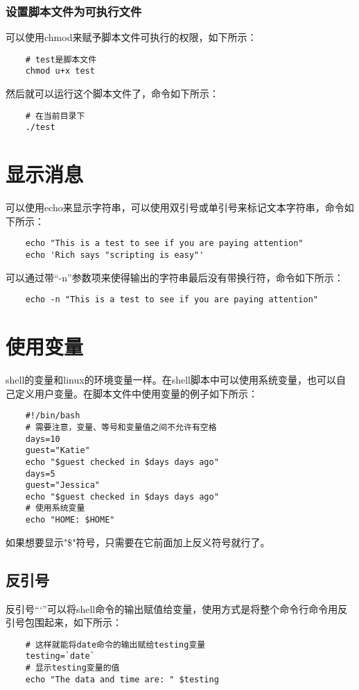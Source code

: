 \documentclass[a4paper,left=1.5cm,right=1.5cm,11pt]{article}
\begin{document}
\subsubsection{设置脚本文件为可执行文件}
	可以使用chmod来赋予脚本文件可执行的权限，如下所示：
	\begin{lstlisting}
	# test是脚本文件
	chmod u+x test
	\end{lstlisting}

	然后就可以运行这个脚本文件了，命令如下所示：
	\begin{lstlisting}
	# 在当前目录下
	./test
	\end{lstlisting}

\section{显示消息}
	可以使用echo来显示字符串，可以使用双引号或单引号来标记文本字符串，命令如下所示：
	\begin{lstlisting}
	echo "This is a test to see if you are paying attention"
	echo 'Rich says "scripting is easy"'
	\end{lstlisting}

	可以通过带“-n”参数项来使得输出的字符串最后没有带换行符，命令如下所示：
	\begin{lstlisting}
	echo -n "This is a test to see if you are paying attention"
	\end{lstlisting}

\section{使用变量}
	shell的变量和linux的环境变量一样。在shell脚本中可以使用系统变量，也可以自己定义用户变量。在脚本文件中使用变量的例子如下所示：
	\begin{lstlisting}
	#!/bin/bash
	# 需要注意，变量、等号和变量值之间不允许有空格
	days=10
	guest="Katie"
	echo "$guest checked in $days days ago"
	days=5
	guest="Jessica"
	echo "$guest checked in $days days ago"
	# 使用系统变量
	echo "HOME: $HOME"
	\end{lstlisting}

	如果想要显示"\$"符号，只需要在它前面加上反义符号就行了。

\subsection{反引号}
	反引号“`”可以将shell命令的输出赋值给变量，使用方式是将整个命令行命令用反引号包围起来，如下所示：
	\begin{lstlisting}
	# 这样就能将date命令的输出赋给testing变量
	testing=`date`
	# 显示testing变量的值
	echo "The data and time are: " $testing
	\end{lstlisting}
\end{document}
